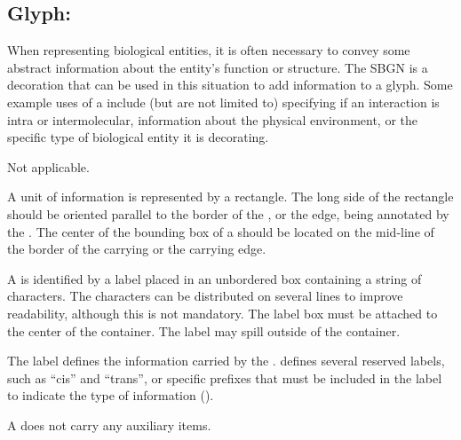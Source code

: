 
\subsection{Glyph: }
\label{sec:unitInformation}

When representing biological entities, it is often necessary to convey some abstract information about the entity's function or structure.  The SBGN  is a decoration that can be used in this situation to add information to a glyph.  Some example uses of a  include (but are not limited to) specifying if an interaction is intra or intermolecular, information about the physical environment, or the specific type of biological entity it is decorating.

\begin{glyphDescription}

\glyphSboTerm Not applicable.

\glyphContainer A unit of information is represented by a rectangle.  The long side of the rectangle should be oriented parallel to the border of the , or the edge, being annotated by the . The center of the bounding box of a  should be located on the mid-line of the border of the carrying  or the carrying edge.

\glyphLabel A  is identified by a label placed in an unbordered box containing a string of characters.  The characters can be distributed on several lines to improve readability, although this is not mandatory.  The label box must be attached to the center of the container.  The label may spill outside of the container.

The label defines the information carried by the .  \SBGNERLone defines several reserved labels, such as ``cis'' and ``trans'', or specific prefixes that must be included in the label to indicate the type of information ().

\glyphAux A  does not carry any auxiliary items.

\end{glyphDescription}

